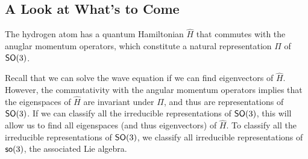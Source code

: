 \subsection{A Look at What's to Come}
The hydrogen atom has a quantum Hamiltonian $\hat{H}$ that commutes with the anuglar momentum operators, which constitute a natural representation $\Pi$ of $\operatorname{\textsf{SO}}(3)$.

Recall that we can solve the wave equation if we can find eigenvectors of $\hat{H}$. However, the commutativity with the angular momentum operators implies that the eigenspaces of $\hat{H}$ are invariant under $\Pi$, and thus are representations of $\operatorname{\textsf{SO}}(3)$. If we can classify all the irreducible representations of $\operatorname{\textsf{SO}}(3)$, this will allow us to find all eigenspaces (and thus eigenvectors) of $\hat{H}$. To classify all the irreducible representations of $\operatorname{\textsf{SO}}(3)$, we classify all irreducible representations of $\operatorname{\textsf{so}}(3)$, the associated Lie algebra.
